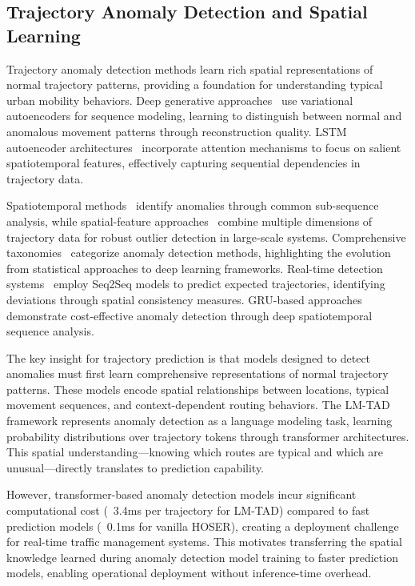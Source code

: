 \subsection{Trajectory Anomaly Detection and Spatial Learning}
\label{sec:lit-anomaly-spatial}

Trajectory anomaly detection methods learn rich spatial representations of normal trajectory patterns, providing a foundation for understanding typical urban mobility behaviors. Deep generative approaches~\cite{liuOnlineAnomalousTrajectory2020} use variational autoencoders for sequence modeling, learning to distinguish between normal and anomalous movement patterns through reconstruction quality. LSTM autoencoder architectures~\cite{huangLSTMAutoencodersAttention2021} incorporate attention mechanisms to focus on salient spatiotemporal features, effectively capturing sequential dependencies in trajectory data.

Spatiotemporal methods~\cite{heSpatiotiemporalTrajectoryAnomaly2022} identify anomalies through common sub-sequence analysis, while spatial-feature approaches~\cite{wuSafetySpatialFeature2024} combine multiple dimensions of trajectory data for robust outlier detection in large-scale systems. Comprehensive taxonomies~\cite{kongMobileTrajectoryAnomaly2024} categorize anomaly detection methods, highlighting the evolution from statistical approaches to deep learning frameworks. Real-time detection systems~\cite{huRealtimeTaxiSpatial2024} employ Seq2Seq models to predict expected trajectories, identifying deviations through spatial consistency measures. GRU-based approaches~\cite{tangLowcostHighperformanceAbnormal2024} demonstrate cost-effective anomaly detection through deep spatiotemporal sequence analysis.

The key insight for trajectory prediction is that models designed to detect anomalies must first learn comprehensive representations of normal trajectory patterns. These models encode spatial relationships between locations, typical movement sequences, and context-dependent routing behaviors. The LM-TAD framework represents anomaly detection as a language modeling task, learning probability distributions over trajectory tokens through transformer architectures. This spatial understanding—knowing which routes are typical and which are unusual—directly translates to prediction capability.

However, transformer-based anomaly detection models incur significant computational cost (~3.4ms per trajectory for LM-TAD) compared to fast prediction models (~0.1ms for vanilla HOSER), creating a deployment challenge for real-time traffic management systems. This motivates transferring the spatial knowledge learned during anomaly detection model training to faster prediction models, enabling operational deployment without inference-time overhead.


